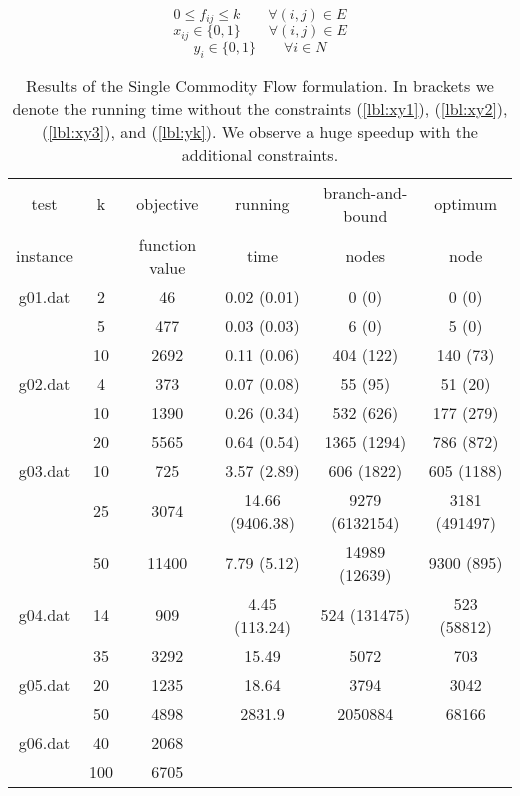 \documentclass [11pt]{article}
\begin{document}
\begin{equation}
0 \leq f_{ij} \leq k \qquad \forall (i,j) \in E
\end{equation}
\begin{equation}
x_{ij} \in \{0,1\} \qquad \forall (i,j) \in E
\end{equation}
\begin{equation}
  y_i \in \{0,1\} \qquad \forall i \in N
\end{equation}

\begin{table} \small
\centering
\begin{tabular}{cccccc}
\hline
test & k & objective & running  & branch-and-bound & optimum    \\
instance & & function value & time & nodes & node  \\
\hline
g01.dat 	& 2 & 46 & 0.02 (0.01) & 0 (0) & 0 (0) \\
		& 5  & 477 & 0.03 (0.03) & 6 (0) & 5 (0) \\
		& 10 & 2692 & 0.11 (0.06) & 404 (122) & 140 (73) \\
g02.dat 	& 4 & 373 & 0.07 (0.08) & 55 (95) & 51 (20) \\
		& 10 & 1390 & 0.26 (0.34) & 532 (626) & 177 (279) \\
		& 20 & 5565 & 0.64 (0.54) & 1365 (1294) & 786 (872) \\
g03.dat 	& 10 & 725 & 3.57 (2.89) & 606 (1822) & 605 (1188) \\
		& 25 & 3074 & 14.66 (9406.38) & 9279 (6132154) & 3181 (491497) \\
		& 50 & 11400 & 7.79 (5.12) & 14989 (12639) & 9300 (895) \\
g04.dat 	& 14 & 909 & 4.45 (113.24) & 524 (131475) & 523 (58812) \\
		& 35 & 3292 & 15.49 & 5072 & 703 \\
g05.dat 	& 20 & 1235 & 18.64 & 3794 & 3042 \\
		& 50 & 4898 & 2831.9 & 2050884 & 68166 \\
g06.dat 	& 40 & 2068 &  &  &   \\
		& 100 & 6705 &  &  &   \\
\hline
\end{tabular}
\caption{Results of the Single Commodity Flow formulation.
In brackets we denote the running time without the constraints (\ref{lbl:xy1}), (\ref{lbl:xy2}), (\ref{lbl:xy3}), and (\ref{lbl:yk}).
We observe a huge speedup with the additional constraints.}
\label{tbl:scf}
\end{table}
\end{document}
